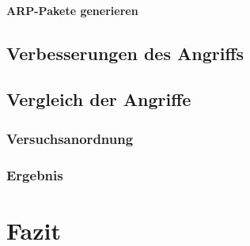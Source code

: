 \documentclass[10pt,a4paper]{article}
\begin{document}
\paragraph{ARP-Pakete generieren}

\subsection{Verbesserungen des Angriffs}

\subsection{Vergleich der Angriffe}

\subsubsection{Versuchsanordnung}

\subsubsection{Ergebnis}

\section{Fazit}

\nocite{*}
\printbibliography
\end{document}
